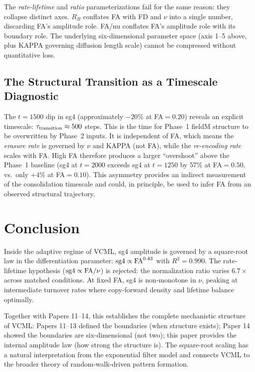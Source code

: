 \documentclass[11pt]{article}
\begin{document}
The \emph{rate-lifetime} and \emph{ratio} parameterizations fail for the
same reason: they collapse distinct axes.
$R_B$ conflates FA with FD and $\nu$ into a single number, discarding
FA's amplitude role.
FA/nu conflates FA's amplitude role with its boundary role.
The underlying six-dimensional parameter space (axis 1--5 above, plus
KAPPA governing diffusion length scale) cannot be compressed without
quantitative loss.

\subsection{The Structural Transition as a Timescale Diagnostic}

The $t=1500$ dip in sg4 (approximately $-20\%$ at FA$=0.20$) reveals
an explicit timescale: $\tau_{\rm transition} \approx 500$ steps.
This is the time for Phase~1 fieldM structure to be overwritten by
Phase~2 inputs.
It is independent of FA, which means the \emph{erasure rate} is governed
by $\nu$ and KAPPA (not FA), while the \emph{re-encoding rate}
scales with FA.
High FA therefore produces a larger ``overshoot'' above the Phase~1 baseline
(sg4 at $t=2000$ exceeds sg4 at $t=1250$ by $57\%$ at FA$=0.50$,
vs.\ only $+4\%$ at FA$=0.10$).
This asymmetry provides an indirect measurement of the consolidation
timescale and could, in principle, be used to infer FA from an
observed structural trajectory.

\section{Conclusion}

Inside the adaptive regime of VCML, sg4 amplitude is governed by a
square-root law in the differentiation parameter:
${\rm sg4} \propto {\rm FA}^{0.43}$ with $R^2 = 0.990$.
The rate-lifetime hypothesis (${\rm sg4} \propto {\rm FA}/\nu$) is
rejected: the normalization ratio varies $6.7\times$ across matched
conditions.
At fixed FA, sg4 is non-monotone in $\nu$, peaking at intermediate
turnover rates where copy-forward density and lifetime balance optimally.

Together with Papers 11--14, this establishes the complete mechanistic
structure of VCML:
Papers 11--13 defined the boundaries (when structure exists);
Paper 14 showed the boundaries are six-dimensional (not two);
this paper provides the internal amplitude law (how strong the structure is).
The square-root scaling has a natural interpretation from the exponential
filter model and connects VCML to the broader theory of random-walk-driven
pattern formation.
\end{document}
